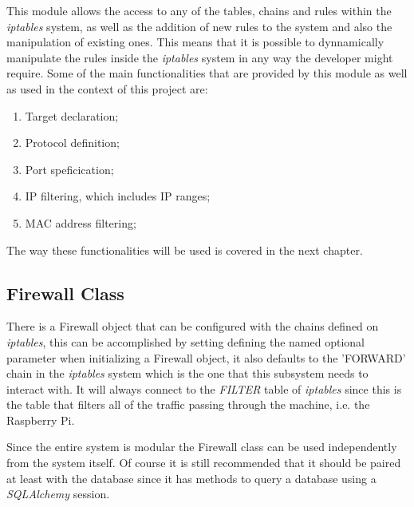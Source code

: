 This module allows the access to any of the tables, chains and rules within the
\emph{iptables} system, as well as the addition of new rules to the system and
also the manipulation of existing ones. This means that it is possible to
dynnamically manipulate the rules inside the \emph{iptables} system in any way
the developer might require.
Some of the main functionalities that are provided by this module as well as
used in the context of this project are:
\begin{enumerate}
	\item Target declaration;
	\item Protocol definition;
	\item Port speficication;
	\item IP filtering, which includes IP ranges;
	\item MAC address filtering;
\end{enumerate}

The way these functionalities will be used is covered in the next chapter.

\subsection{Firewall Class}
\label{chap4:sec:firewall-sys:firewall-class}
There is a Firewall object that can be configured with the chains defined on
\emph{iptables}, this can be accomplished by setting defining the named optional
parameter when initializing a Firewall object, it also defaults to the 'FORWARD'
chain in the \emph{iptables} system which is the one that this subsystem needs
to interact with. It will always connect to the \emph{FILTER} table of
\emph{iptables} since this is the table that filters all of the traffic passing
through the machine, i.e. the Raspberry Pi.

Since the entire system is modular the Firewall class can be used independently
from the system itself. Of course it is still recommended that it should be
paired at least with the database since it has methods to query a database using
a \emph{SQLAlchemy} session.

